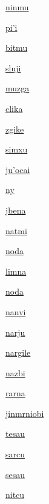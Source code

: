 {\hyperlink{val:ninmu}{ninmu}}{}{}{}

{\hyperlink{val:pihi}{pi'i}}{}{}{}

{\hyperlink{val:bitmu}{bitmu}}{}{}{}

{\hyperlink{val:sluji}{sluji}}{}{}{}

{\hyperlink{val:muzga}{muzga}}{}{}{}

{\hyperlink{val:clika}{clika}}{}{}{}

{\hyperlink{val:zgike}{zgike}}{}{}{}

{\hyperlink{val:simxu}{simxu}}{}{}{}

{\hyperlink{val:juhocai}{ju'ocai}}{}{}{}

{\hyperlink{val:ny}{ny}}{}{}{}

{\hyperlink{val:jbena}{jbena}}{}{}{}

{\hyperlink{val:natmi}{natmi}}{}{}{}

{\hyperlink{val:noda}{noda}}{}{}{}

{\hyperlink{val:limna}{limna}}{}{}{}

{\hyperlink{val:noda}{noda}}{}{}{}

{\hyperlink{val:nanvi}{nanvi}}{}{}{}

{\hyperlink{val:narju}{narju}}{}{}{}

{\hyperlink{val:nargile}{nargile}}{}{}{}

{\hyperlink{val:nazbi}{nazbi}}{}{}{}

{\hyperlink{val:rarna}{rarna}}{}{}{}

{\hyperlink{val:jinmrniobi}{jinmrniobi}}{}{}{}

{\hyperlink{val:tesau}{tesau}}{}{}{}

{\hyperlink{val:sarcu}{sarcu}}{}{}{}

{\hyperlink{val:sesau}{sesau}}{}{}{}

{\hyperlink{val:nitcu}{nitcu}}{}{}{}

